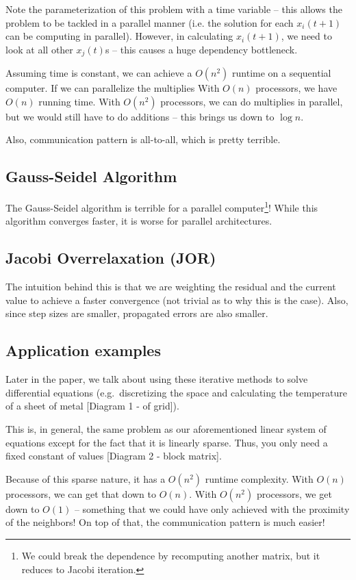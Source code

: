 Note the parameterization of this problem with a time variable -- this allows the problem to be tackled in a parallel manner (i.e. the solution for each \( x_{i}(t+1) \) can be computing in parallel). However, in calculating \( x_{i}(t+1) \), we need to look at all other \( x_{j} (t)\)s -- this causes a huge dependency bottleneck. 

Assuming time is constant, we can achieve a \( O (n^2) \) runtime on a sequential computer. If we can parallelize the multiplies With \( O(n) \) processors, we have \( O(n) \) running time. With \( O(n^2) \) processors, we can do multiplies in parallel, but we would still have to do additions -- this brings us down to \( \log{n} \).

Also, communication pattern is all-to-all, which is pretty terrible.

\subsection{Gauss-Seidel Algorithm}

The Gauss-Seidel algorithm is terrible for a parallel computer\footnote{We could break the dependence by recomputing another matrix, but it reduces to Jacobi iteration.}! While this algorithm converges faster, it is worse for parallel architectures.

\subsection{Jacobi Overrelaxation (JOR)}
The intuition behind this is that we are weighting the residual and the current value to achieve a faster convergence (not trivial as to why this is the case). Also, since step sizes are smaller, propagated errors are also smaller.

\subsection{Application examples}

Later in the paper, we talk about using these iterative methods to solve differential equations (e.g.\ discretizing the space and calculating the temperature of a sheet of metal [Diagram 1 - of grid]).

This is, in general, the same problem as our aforementioned linear system of equations except for the fact that it is linearly sparse. Thus, you only need a fixed constant of values [Diagram 2 - block matrix].

Because of this sparse nature, it has a \( O(n^2) \) runtime complexity. With \( O(n) \) processors, we can get that down to \( O(n) \). With \( O(n^2) \) processors, we get down to \( O(1) \) -- something that we could have only achieved with the proximity of the neighbors! On top of that, the communication pattern is much easier!

